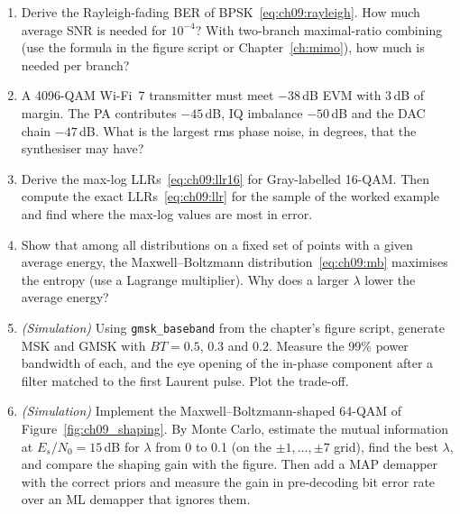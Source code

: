 \begin{enumerate}[label=\thechapter.\arabic*]
signalling with energy $2E_b$, detected noncoherently, and hence derive $P_b=\tfrac12e^{-E_b/N_0}$ from
equation~\eqref{eq:ch09:ncfsk}.
\item Derive the Rayleigh-fading BER of BPSK~\eqref{eq:ch09:rayleigh}. How much average SNR is needed
for $10^{-4}$? With two-branch maximal-ratio combining (use the formula in the figure script or
Chapter~\ref{ch:mimo}), how much is needed per branch?
\item A 4096-QAM Wi-Fi~7 transmitter must meet $-38$\,dB EVM with 3\,dB of margin. The PA contributes
$-45$\,dB, IQ imbalance $-50$\,dB and the DAC chain $-47$\,dB. What is the largest rms phase noise, in
degrees, that the synthesiser may have?
\item Derive the max-log LLRs~\eqref{eq:ch09:llr16} for Gray-labelled 16-QAM. Then compute the exact
LLRs~\eqref{eq:ch09:llr} for the sample of the worked example and find where the max-log values
are most in error.
\item Show that among all distributions on a fixed set of points with a given average energy, the
Maxwell--Boltzmann distribution~\eqref{eq:ch09:mb} maximises the entropy (use a Lagrange
multiplier). Why does a larger $\lambda$ lower the average energy?
\item \emph{(Simulation)} Using \texttt{gmsk\_baseband} from the chapter's figure script, generate MSK
and GMSK with $BT=0.5$, $0.3$ and $0.2$. Measure the 99\% power bandwidth of each, and the eye opening
of the in-phase component after a filter matched to the first Laurent pulse. Plot the trade-off.
\item \emph{(Simulation)} Implement the Maxwell--Boltzmann-shaped 64-QAM of
Figure~\ref{fig:ch09_shaping}. By Monte Carlo, estimate the mutual information at $E_s/N_0=15$\,dB
for $\lambda$ from 0 to 0.1 (on the $\pm1,\dots,\pm7$ grid), find the best $\lambda$, and compare the
shaping gain with the figure. Then add a MAP demapper with the correct priors and measure the gain
in pre-decoding bit error rate over an ML demapper that ignores them.
\end{enumerate}

